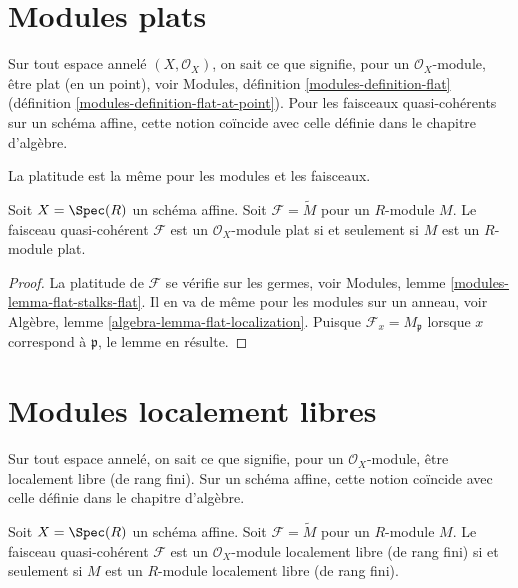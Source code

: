 \section{Modules plats}
\label{section-flat}

\noindent
Sur tout espace annelé $(X, \mathcal{O}_X)$,
on sait ce que signifie, pour un $\mathcal{O}_X$-module,
être plat (en un point), voir
Modules, définition \ref{modules-definition-flat}
(définition \ref{modules-definition-flat-at-point}).
Pour les faisceaux quasi-cohérents sur un schéma affine, cette notion coïncide avec
celle définie dans le chapitre d'algèbre.

\begin{lemma}
\label{lemma-flat-module}
\begin{slogan}
La platitude est la même pour les modules et les faisceaux.
\end{slogan}
Soit $X = \Spec(R)$ un schéma affine.
Soit $\mathcal{F} = \widetilde{M}$ pour un $R$-module $M$.
Le faisceau quasi-cohérent $\mathcal{F}$ est un
$\mathcal{O}_X$-module plat si et seulement si $M$ est un $R$-module plat.
\end{lemma}

\begin{proof}
La platitude de $\mathcal{F}$ se vérifie sur les germes, voir
Modules, lemme \ref{modules-lemma-flat-stalks-flat}.
Il en va de même pour les modules sur un anneau, voir
Algèbre, lemme \ref{algebra-lemma-flat-localization}.
Puisque $\mathcal{F}_x = M_{\mathfrak p}$ lorsque $x$ correspond
à $\mathfrak p$, le lemme en résulte.
\end{proof}





\section{Modules localement libres}
\label{section-finite-locally-free}

\noindent
Sur tout espace annelé, on sait ce que signifie, pour un $\mathcal{O}_X$-module,
être localement libre (de rang fini). Sur un schéma affine, cette notion coïncide avec
celle définie dans le chapitre d'algèbre.

\begin{lemma}
\label{lemma-locally-free-module}
Soit $X = \Spec(R)$ un schéma affine.
Soit $\mathcal{F} = \widetilde{M}$ pour un $R$-module $M$.
Le faisceau quasi-cohérent $\mathcal{F}$ est un
$\mathcal{O}_X$-module localement libre (de rang fini) si et seulement si $M$ est
un $R$-module localement libre (de rang fini).
\end{lemma}

